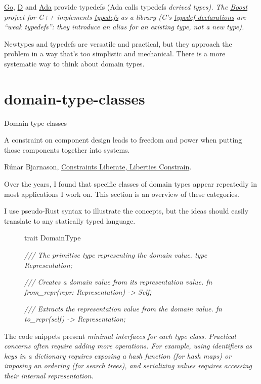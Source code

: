 \documentclass{article}
\begin{document}
\href{https://go.dev/ref/spec#Type_definitions}{Go}, \href{https://dlang.org/library/std/typecons/typedef.html}{D} and \href{https://en.wikibooks.org/wiki/Ada_Programming/Type_System#Derived_types}{Ada} provide typedefs (Ada calls typedefs \em{derived types}).
The \href{https://www.boost.org/}{Boost} project for C++ implements \href{https://www.boost.org/doc/libs/1_61_0/libs/serialization/doc/strong_typedef.html}{typedefs} as a library
(C's \href{https://en.cppreference.com/w/c/language/typedef}{typedef declarations} are ``weak typedefs'': they introduce an alias for an existing type, not a new type).

Newtypes and typedefs are versatile and practical, but they approach the problem in a way that's too simplistic and mechanical.
There is a more systematic way to think about domain types.

\section{domain-type-classes}{Domain type classes}

\epigraph{A constraint on component design leads to freedom and power when putting those components together into systems.}{
  Rúnar Bjarnason, \href{https://www.youtube.com/watch?v=GqmsQeSzMdw}{Constraints Liberate, Liberties Constrain}.
}

Over the years, I found that specific classes of domain types appear repeatedly in most applications I work on.
This section is an overview of these categories.

I use pseudo-Rust syntax to illustrate the concepts, but the ideas should easily translate to any statically typed language.

\begin{figure}
\begin{code}
trait DomainType {
  \em{/// The primitive type representing the domain value.}
  type Representation; \label{representation-type}

  \em{/// Creates a domain value from its representation value.}
  fn from_repr(repr: Representation) -> Self;

  \em{/// Extracts the representation value from the domain value.}
  fn to_repr(self) -> Representation;
}
\end{code}
\end{figure}

The code snippets present \em{minimal} interfaces for each type class.
Practical concerns often require adding more operations.
For example, using identifiers as keys in a dictionary requires exposing a hash function (for hash maps) or imposing an ordering (for search trees), and serializing values requires accessing their internal representation.
\end{document}
